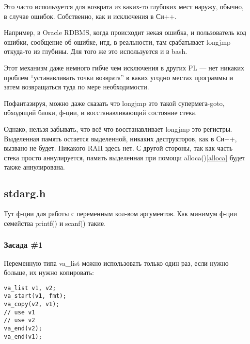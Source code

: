 Это часто используется для возврата из каких-то глубоких мест наружу, обычно, в случае ошибок.
Собственно, как и исключения в Си++.

Например, в Oracle RDBMS, когда происходит некая ошибка, и пользователь код ошибки, сообщение об ошибке, итд,
в реальности, там срабатывает longjmp откуда-то из глубины. Для того же это используется и в bash.

Этот механизм даже немного гибче чем исключения в других \ac{PL} --- нет никаких проблем ``устанавливать точки 
возврата'' в каких угодно местах программы и затем возвращаться туда по мере необходимости.

\label{goto}
Пофантазируя, можно даже сказать что longjmp это такой супермега-goto, обходящий блоки, ф-ции, и восстанавливающий
состояние стека.

Однако, нельзя забывать, что всё что восстанавливает longjmp это регистры. Выделенная память остается выделенной,
никаких деструкторов, как в Си++, вызвано не будет. Никакого \ac{RAII} здесь нет. 
С другой стороны, так как часть стека просто аннулируется, 
память выделенная при помощи alloca()\ref{alloca} будет также аннулирована.

\subsection{stdarg.h}

Тут ф-ции для работы с переменным кол-вом аргументов. Как минимум ф-ции семейства printf() и scanf() такие.

\subsubsection{Засада \#1}

Переменную типа va\_list можно использовать только один раз, если нужно больше, их нужно копировать:

\begin{lstlisting}
va_list v1, v2;
va_start(v1, fmt);
va_copy(v2, v1);
// use v1
// use v2
va_end(v2);
va_end(v1);
\end{lstlisting}

